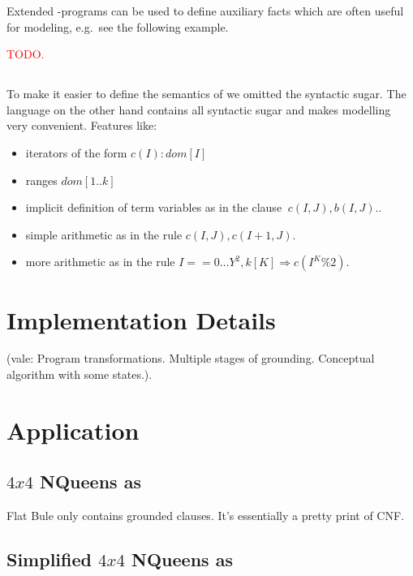 \documentclass[conference]{IEEEtran}
\newcommand{\vale}[1]{\textcolor[rgb]{1.00,0.00,0.0}{(vale: #1). } }
\begin{document}
Extended \bcore-programs can be used to define auxiliary facts which
are often useful for modeling, e.g.~see the following example. 
%
\begin{example}
  \textcolor{red}{TODO.}
\end{example}


\subsection{\bnice}

To make it easier to define the semantics of \bfull we omitted the syntactic sugar. 
The language \bnice on the other hand contains all syntactic sugar and makes modelling very convenient.  
Features like: 

\begin{itemize}
  \item iterators of the form $c(I):dom[I]$
  \item ranges $dom[1..k]$ 
  \item implicit definition of term variables as in the clause $~c(I,J),b(I,J).$.
  \item simple arithmetic as in the rule $c(I,J),c(I+1,J).$ 
  \item more arithmetic as in the rule $ I== 0 \ldots Y^2, k[K] \Rightarrow c(I^K\%2).$
\end{itemize}

\section{Implementation Details}

\vale{Program transformations. Multiple stages of grounding. Conceptual algorithm with some states.}

\section{Application}

\subsection{$4x4$ NQueens as \bflat}

Flat Bule only contains grounded clauses. It's essentially a pretty print of CNF.



\subsection{Simplified $4x4$ NQueens as \bcore}
\end{document}
